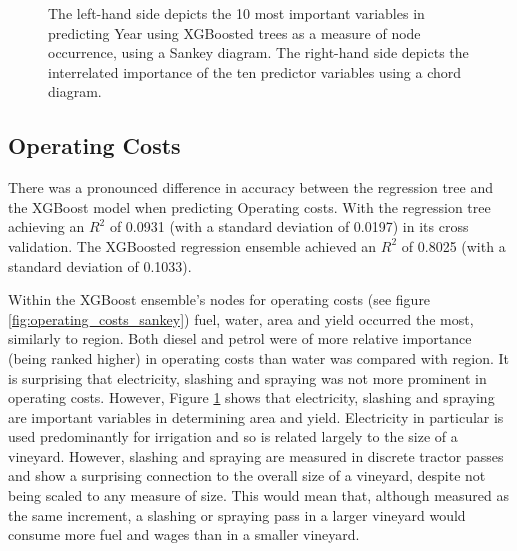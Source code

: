 \documentclass[review,12pt,authoryear]{elsarticle}
\begin{document}
\begin{linenumbers}
\begin{figure}
 \caption{The left-hand side depicts the 10 most important variables in predicting Year using XGBoosted trees as a measure of node occurrence, using a Sankey diagram. The right-hand side depicts the interrelated importance of the ten predictor variables using a chord diagram.}\label{fig:year_sankey}
\end{figure}

\subsection{Operating Costs}

There was a pronounced difference in accuracy between the regression tree and the XGBoost model when predicting Operating costs. With the regression tree achieving an $R^2$ of 0.0931 (with a standard deviation of 0.0197) in its cross validation. The XGBoosted regression ensemble achieved an $R^2$ of 0.8025 (with a standard deviation of 0.1033).
\par
Within the XGBoost ensemble's nodes for operating costs (see figure \ref{fig:operating_costs_sankey}) fuel, water, area and yield occurred the most, similarly to region. Both diesel and petrol were of more relative importance (being ranked higher) in operating costs than water was compared with region. It is surprising that electricity, slashing and spraying was not more prominent in operating costs. However, Figure \ref{fig:year_sankey} shows that electricity, slashing and spraying are important variables in determining area and yield. Electricity in particular is used predominantly for irrigation and so is related largely to the size of a vineyard. However, slashing and spraying are measured in discrete tractor passes and show a surprising connection to the overall size of a vineyard, despite not being scaled to any measure of size. This would mean that, although measured as the same increment, a slashing or spraying pass in a larger vineyard would consume more fuel and wages than in a smaller vineyard.


\end{linenumbers}
\end{document}

